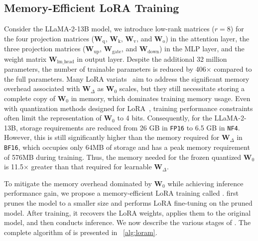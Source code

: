 \subsection{Memory-Efficient LoRA Training} 
Consider the LLaMA-2-13B model,
we introduce 
low-rank matrices ($r=8$) for 
the four projection matrices ($\mathbf{W}_\text{q}$, $\mathbf{W}_\text{k}$, $\mathbf{W}_\text{v}$, and $\mathbf{W}_\text{o}$) in the attention layer, the three projection matrices ($\mathbf{W}_\text{up}$, $\mathbf{W}_\text{gate}$, and $\mathbf{W}_\text{down}$) in the MLP layer, and the weight matrix $\mathbf{W}_\text{lm\_head}$ in output layer. 
Despite the additional 32 million parameters, the number of trainable parameters is reduced by 406$\times$ compared to the full parameters.
Many LoRA variats~\citep{zhou:2024loradrop,zhang2023lorafa,kopiczko2024vera,azizi2024lamda,wang2024prolora} aim to address the significant memory overhead associated with $\mathbf{W}_{\Delta}$ as $\mathbf{W}_0$ scales, but they still necessitate storing a complete copy of $\mathbf{W}_0$ in memory, which dominates training memory usage. Even with quantization methods designed for LoRA~\citep{Tim:2023qlora,Xu:2023QALoRA,li2024loftq,guo2024lqlora,OPTQ2023,chai2023int21}, training performance constraints often limit the representation of $\mathbf{W}_{0}$ to 4 bits. Consequently, for the LLaMA-2-13B, storage requirements are reduced from 26 GB in \texttt{FP16} to 6.5 GB in \texttt{NF4}. 
However, this is still significantly higher than the memory required for $\mathbf{W}_{\Delta}$ in \texttt{BF16}, 
which occupies only 64MB of storage and has a peak memory requirement of 576MB during training. Thus, the memory needed for the frozen quantized $\mathbf{W}_{0}$ is 11.5$\times$ greater than that required for learnable $\mathbf{W}_{\Delta}$.

To mitigate the memory overhead dominated by $\mathbf{W}_0$ while achieving inference performance gain, we propose a memory-efficient LoRA training called \method. 
\method first prunes the model to a smaller size and performs LoRA fine-tuning on the pruned model. 
After training, it recovers the LoRA weights, applies them to the original model, and then conducts inference.
We now describe the various stages of \method.
The complete algorithm of \method is presented in ~\cref{alg:loram}.

